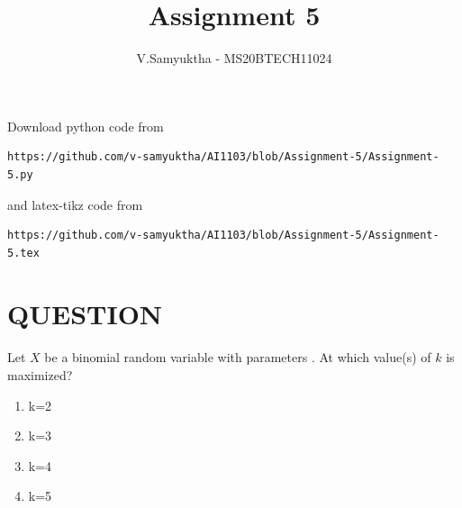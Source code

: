 \documentclass[journal,12pt,twocolumn]{IEEEtran}
\begin{document}
     \def\rightbox#1{\makebox[0in][r]{#1}}
     \def\centbox#1{\makebox[0in]{#1}}
     \def\topbox#1{\raisebox{-\baselineskip}[0in][0in]{#1}}
     \def\midbox#1{\raisebox{-0.5\baselineskip}[0in][0in]{#1}}
\vspace{3cm}
\title{Assignment 5}
\author{V.Samyuktha - MS20BTECH11024}
\maketitle
\newpage
\bigskip
\renewcommand{\thefigure}{\theenumi}
\renewcommand{\thetable}{\theenumi}
Download python code from 
\begin{lstlisting}
https://github.com/v-samyuktha/AI1103/blob/Assignment-5/Assignment-5.py
\end{lstlisting}
%
and latex-tikz code from 
%
\begin{lstlisting}
https://github.com/v-samyuktha/AI1103/blob/Assignment-5/Assignment-5.tex
\end{lstlisting}
\section{\textbf{QUESTION}}
Let $X$ be a binomial random variable with parameters . At which value(s) of $k$ is  maximized?\\
\begin{enumerate}
\item k=2 
\item k=3 
\item k=4 
\item k=5
\end{enumerate}
\end{document}
